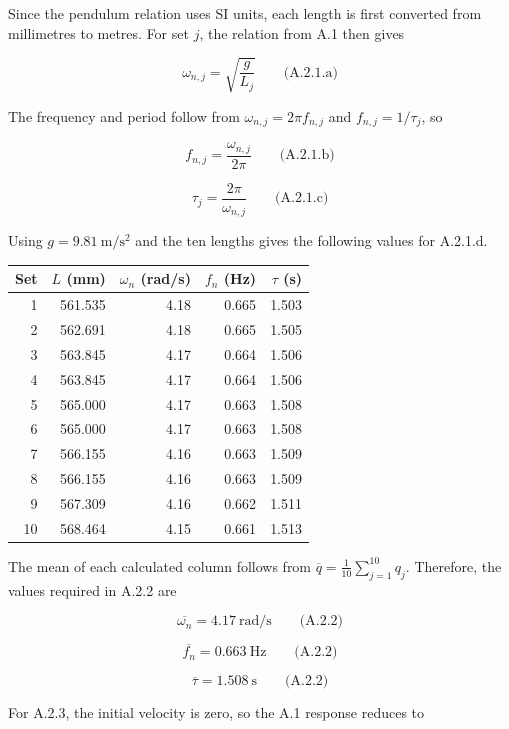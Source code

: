 Since the pendulum relation uses SI units, each length is first converted from millimetres to metres. For set \(j\), the relation from A.1 then gives

\[\boxed{\omega_{n,j}=\sqrt{\frac{g}{L_j}}}\qquad\text{(A.2.1.a)}\]

The frequency and period follow from \(\omega_{n,j}=2\pi f_{n,j}\) and \(f_{n,j}=1/\tau_j\), so

\[\boxed{f_{n,j}=\frac{\omega_{n,j}}{2\pi}}\qquad\text{(A.2.1.b)}\]

\[\boxed{\tau_j=\frac{2\pi}{\omega_{n,j}}}\qquad\text{(A.2.1.c)}\]

Using \(g=9.81\ \mathrm{m/s^2}\) and the ten lengths gives the following values for A.2.1.d.

{ %
\begin{center}\small\begin{tabular}{@{}rrrrr@{}}
\toprule\noalign{}
Set & \(L\) (mm) & \(\omega_n\) (rad/s) & \(f_n\) (Hz) & \(\tau\) (s) \\
\midrule\noalign{}
1 & 561.535 & 4.18 & 0.665 & 1.503 \\
2 & 562.691 & 4.18 & 0.665 & 1.505 \\
3 & 563.845 & 4.17 & 0.664 & 1.506 \\
4 & 563.845 & 4.17 & 0.664 & 1.506 \\
5 & 565.000 & 4.17 & 0.663 & 1.508 \\
6 & 565.000 & 4.17 & 0.663 & 1.508 \\
7 & 566.155 & 4.16 & 0.663 & 1.509 \\
8 & 566.155 & 4.16 & 0.663 & 1.509 \\
9 & 567.309 & 4.16 & 0.662 & 1.511 \\
10 & 568.464 & 4.15 & 0.661 & 1.513 \\
\bottomrule\end{tabular}\end{center}
}

The mean of each calculated column follows from \(\overline{q}=\frac{1}{10}\sum_{j=1}^{10}q_j\). Therefore, the values required in A.2.2 are

\[\boxed{\overline{\omega_n}=4.17\ \mathrm{rad/s}}\qquad\text{(A.2.2)}\]

\[\boxed{\overline{f_n}=0.663\ \mathrm{Hz}}\qquad\text{(A.2.2)}\]

\[\boxed{\overline{\tau}=1.508\ \mathrm{s}}\qquad\text{(A.2.2)}\]

For A.2.3, the initial velocity is zero, so the A.1 response reduces to

